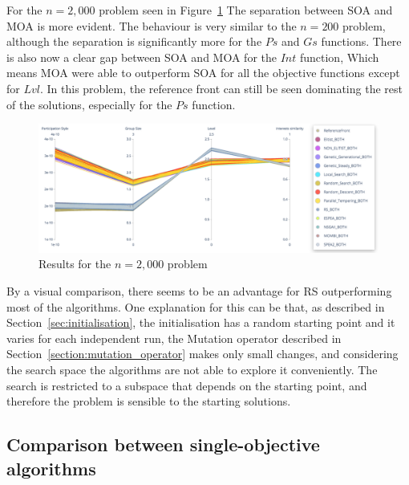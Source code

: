 For the $n=2,000$ problem seen in Figure~\ref{fig:parallel_2000} The separation between SOA and MOA is more evident. The behaviour is very similar to the $n=200$ problem, although the separation is significantly more for the $Ps$ and $Gs$ functions. There is also now a clear gap between SOA and MOA for the $Int$ function, Which means MOA were able to outperform SOA for all the objective functions except for $Lvl$. In this problem, the reference front can still be seen dominating the rest of the solutions, especially for the $Ps$ function.

\begin{figure}[H]
    \centering
    \includegraphics[width=\textwidth]{images/parallel_2000.png}
    \caption{Results for the $n=2,000$ problem}
    \label{fig:parallel_2000}
\end{figure}

By a visual comparison, there seems to be an advantage for RS outperforming most of the algorithms. One explanation for this can be that, as described in Section~\ref{sec:initialisation}, the initialisation has a random starting point and it varies for each independent run, the Mutation operator described in Section~\ref{section:mutation_operator} makes only small changes, and considering the search space the algorithms are not able to explore it conveniently. The search is restricted to a subspace that depends on the starting point, and therefore the problem is sensible to the starting solutions.

\subsection{Comparison between single-objective algorithms}

